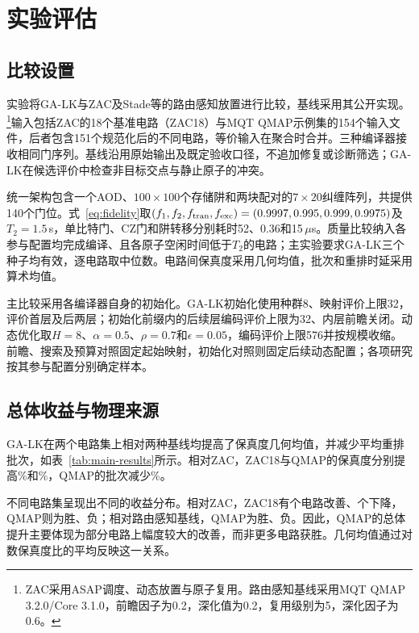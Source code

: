 \section{实验评估}
\label{sec:evaluation}

\subsection{比较设置}
\label{sec:experimental-setup}

实验将GA-LK与ZAC\cite{lin2025zac}及Stade等的路由感知放置\cite{stade2025routingaware}进行比较，基线采用其公开实现。\footnote{ZAC采用ASAP调度、动态放置与原子复用。路由感知基线采用MQT QMAP 3.2.0/Core 3.1.0，前瞻因子为0.2，深化值为0.2，复用级别为5，深化因子为0.6。}输入包括ZAC的18个基准电路（ZAC18）\cite{lin2025zac}与MQT QMAP示例集的154个输入文件\cite{wille2023qmap}，后者包含151个规范化后的不同电路，等价输入在聚合时合并。三种编译器接收相同门序列。基线沿用原始输出及既定验收口径，不追加修复或诊断筛选；GA-LK在候选评价中检查非目标交点与静止原子的冲突。

统一架构包含一个AOD、$100\times100$个存储阱和两块配对的$7\times20$纠缠阵列，共提供140个门位。式~\eqref{eq:fidelity}取$(f_1,f_2,f_{\rm tran},f_{\rm exc})=(0.9997,0.995,0.999,0.9975)$及$T_2=1.5$\,s，单比特门、CZ门和阱转移分别耗时52、0.36和15\,$\mu$s。质量比较纳入各参与配置均完成编译、且各原子空闲时间低于$T_2$的电路；主实验要求GA-LK三个种子均有效，逐电路取中位数。电路间保真度采用几何均值，批次和重排时延采用算术均值。

主比较采用各编译器自身的初始化。GA-LK初始化使用种群8、映射评价上限32，评价首层及后两层；初始化前缀内的后续层编码评价上限为32、内层前瞻关闭。动态优化取$H=8$、$\alpha=0.5$、$\rho=0.7$和$\epsilon=0.05$，编码评价上限576并按规模收缩。前瞻、搜索及预算对照固定起始映射，初始化对照则固定后续动态配置；各项研究按其参与配置分别确定样本。

\subsection{总体收益与物理来源}

GA-LK在两个电路集上相对两种基线均提高了保真度几何均值，并减少平均重排批次，如表~\ref{tab:main-results}所示。相对ZAC，ZAC18与QMAP的保真度分别提高\GAMainZACVsZACFidelityGain\%和\GAMainQMAPVsZACFidelityGain\%，QMAP的批次减少\GAMainQMAPVsZACBatchReduction\%。



不同电路集呈现出不同的收益分布。相对ZAC，ZAC18有\GAMainZACVsZACWins 个电路改善、\GAMainZACVsZACLosses 个下降，QMAP则为\GAMainQMAPVsZACWins 胜、\GAMainQMAPVsZACLosses 负；相对路由感知基线，QMAP为\GAMainQMAPVsICCADWins 胜、\GAMainQMAPVsICCADLosses 负。因此，QMAP的总体提升主要体现为部分电路上幅度较大的改善，而非更多电路获胜。几何均值通过对数保真度比的平均反映这一关系。

